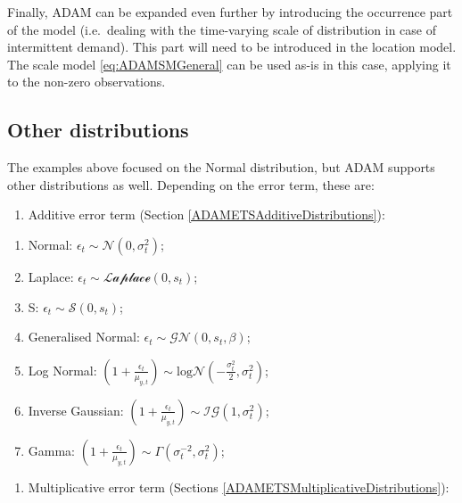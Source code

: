 \documentclass[
]{book}
\providecommand{\tightlist}{%
  \setlength{\itemsep}{0pt}\setlength{\parskip}{0pt}}
\theoremstyle{definition}
\theoremstyle{definition}
\theoremstyle{definition}
\theoremstyle{definition}
\theoremstyle{remark}
\begin{document}
Finally, ADAM can be expanded even further by introducing the occurrence part of the model (i.e.~dealing with the time-varying scale of distribution in case of intermittent demand). This part will need to be introduced in the location model. The scale model \eqref{eq:ADAMSMGeneral} can be used as-is in this case, applying it to the non-zero observations.

\hypertarget{SMDistributions}{%
\subsection{Other distributions}\label{SMDistributions}}

The examples above focused on the Normal distribution, but ADAM supports other distributions as well. Depending on the error term, these are:

\begin{enumerate}
\def\labelenumi{\arabic{enumi}.}
\tightlist
\item
  Additive error term (Section \ref{ADAMETSAdditiveDistributions}):
\end{enumerate}

\begin{enumerate}
\def\labelenumi{\alph{enumi}.}
\tightlist
\item
  Normal: \(\epsilon_t \sim \mathcal{N}(0, \sigma_t^2)\);
\item
  Laplace: \(\epsilon_t \sim \mathcal{Laplace}(0, s_t)\);
\item
  S: \(\epsilon_t \sim \mathcal{S}(0, s_t)\);
\item
  Generalised Normal: \(\epsilon_t \sim \mathcal{GN}(0, s_t, \beta)\);
\item
  Log Normal: \(\left(1+\frac{\epsilon_t}{\mu_{y,t}} \right) \sim \text{log}\mathcal{N}\left(-\frac{\sigma_t^2}{2}, \sigma_t^2\right)\);
\item
  Inverse Gaussian: \(\left(1+\frac{\epsilon_t}{\mu_{y,t}} \right) \sim \mathcal{IG}(1, \sigma_t^2)\);
\item
  Gamma: \(\left(1+\frac{\epsilon_t}{\mu_{y,t}} \right) \sim \mathcal{\Gamma}(\sigma_t^{-2}, \sigma_t^2)\);
\end{enumerate}

\begin{enumerate}
\def\labelenumi{\arabic{enumi}.}
\setcounter{enumi}{1}
\tightlist
\item
  Multiplicative error term (Sections \ref{ADAMETSMultiplicativeDistributions}):
\end{enumerate}
\end{document}
